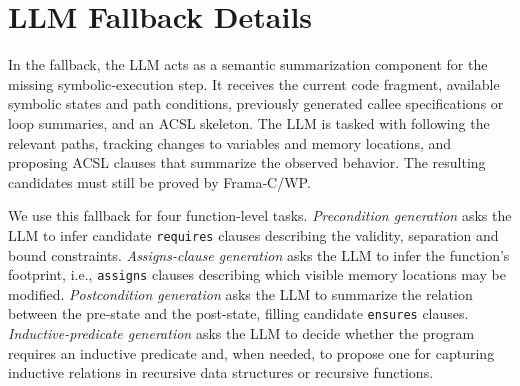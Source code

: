\section{LLM Fallback Details}
\label{app:fallback}

In the fallback, the LLM acts as a semantic summarization component for the missing symbolic‑execution step. It receives the current code fragment, available symbolic states and path conditions, previously generated callee specifications or loop summaries, and an ACSL skeleton. The LLM is tasked with following the relevant paths, tracking changes to variables and memory locations, and proposing ACSL clauses that summarize the observed behavior. The resulting candidates must still be proved by Frama‑C/WP. 


We use this fallback for four function-level tasks. \emph{Precondition generation} asks the LLM to infer candidate \texttt{requires} clauses describing the validity, separation and bound constraints. \emph{Assigns-clause generation} asks the LLM to infer the function's footprint, i.e., \texttt{assigns} clauses describing which visible memory locations may be modified. \emph{Postcondition generation} asks the LLM to summarize the relation between the pre-state and the post-state, filling candidate \texttt{ensures} clauses. \emph{Inductive-predicate generation} asks the LLM to decide whether the program requires an inductive predicate and, when needed, to propose one for capturing inductive relations in recursive data structures or recursive functions.

